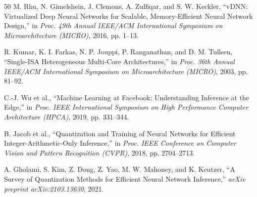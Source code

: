 \documentclass[conference]{IEEEtran}
\begin{document}
\begin{thebibliography}{50}
 M. Rhu, N. Gimelshein, J. Clemons, A. Zulfiqar, and S. W. Keckler, ``vDNN: Virtualized Deep Neural Networks for Scalable, Memory-Efficient Neural Network Design,'' in \textit{Proc. 49th Annual IEEE/ACM International Symposium on Microarchitecture (MICRO)}, 2016, pp. 1--13.

 R. Kumar, K. I. Farkas, N. P. Jouppi, P. Ranganathan, and D. M. Tullsen, ``Single-ISA Heterogeneous Multi-Core Architectures,'' in \textit{Proc. 36th Annual IEEE/ACM International Symposium on Microarchitecture (MICRO)}, 2003, pp. 81--92.

 C.-J. Wu et al., ``Machine Learning at Facebook: Understanding Inference at the Edge,'' in \textit{Proc. IEEE International Symposium on High Performance Computer Architecture (HPCA)}, 2019, pp. 331--344.

 B. Jacob et al., ``Quantization and Training of Neural Networks for Efficient Integer-Arithmetic-Only Inference,'' in \textit{Proc. IEEE Conference on Computer Vision and Pattern Recognition (CVPR)}, 2018, pp. 2704--2713.

 A. Gholami, S. Kim, Z. Dong, Z. Yao, M. W. Mahoney, and K. Keutzer, ``A Survey of Quantization Methods for Efficient Neural Network Inference,'' \textit{arXiv preprint arXiv:2103.13630}, 2021.

\end{thebibliography}
\end{document}

